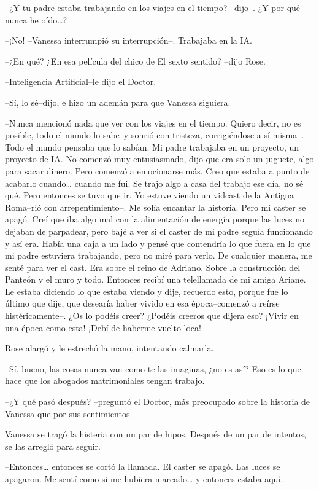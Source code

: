 --¿Y tu padre estaba trabajando en los viajes en el tiempo? --dijo--. ¿Y
por qué nunca he oído\ldots{}?

--¡No! --Vanessa interrumpió su interrupción--. Trabajaba en la IA.

--¿En qué? ¿En esa película del chico de El sexto sentido? --dijo Rose.

--Inteligencia Artificial--le dijo el Doctor.

--Sí, lo sé--dijo, e hizo un ademán para que Vanessa siguiera.

--Nunca mencionó nada que ver con los viajes en el tiempo. Quiero decir,
no es posible, todo el mundo lo sabe--y sonrió con tristeza,
corrigiéndose a sí misma--. Todo el mundo pensaba que lo sabían. Mi
padre trabajaba en un proyecto, un proyecto de IA. No comenzó muy
entusiasmado, dijo que era solo un juguete, algo para sacar dinero. Pero
comenzó a emocionarse más. Creo que estaba a punto de acabarlo
cuando\ldots{} cuando me fui. Se trajo algo a casa del trabajo ese día,
no sé qué. Pero entonces se tuvo que ir. Yo estuve viendo un vidcast de
la Antigua Roma--rió con arrepentimiento--. Me solía encantar la
historia. Pero mi caster se apagó. Creí que iba algo mal con la
alimentación de energía porque las luces no dejaban de parpadear, pero
bajé a ver si el caster de mi padre seguía funcionando y así era. Había
una caja a un lado y pensé que contendría lo que fuera en lo que mi
padre estuviera trabajando, pero no miré para verlo. De cualquier
manera, me senté para ver el cast. Era sobre el reino de Adriano. Sobre
la construcción del Panteón y el muro y todo. Entonces recibí una
telellamada de mi amiga Ariane. Le estaba diciendo lo que estaba viendo
y dije, recuerdo esto, porque fue lo último que dije, que desearía haber
vivido en esa época--comenzó a reírse histéricamente--. ¿Os lo podéis
creer? ¿Podéis creeros que dijera eso? ¡Vivir en una época como esta!
¡Debí de haberme vuelto loca!

Rose alargó y le estrechó la mano, intentando calmarla.

--Sí, bueno, las cosas nunca van como te las imaginas, ¿no es así? Eso
es lo que hace que los abogados matrimoniales tengan trabajo.

--¿Y qué pasó después? --preguntó el Doctor, más preocupado sobre la
historia de Vanessa que por sus sentimientos.

Vanessa se tragó la histeria con un par de hipos. Después de un par de
intentos, se las arregló para seguir.

--Entonces\ldots{} entonces se cortó la llamada. El caster se apagó. Las
luces se apagaron. Me sentí como si me hubiera mareado\ldots{} y
entonces estaba aquí.

